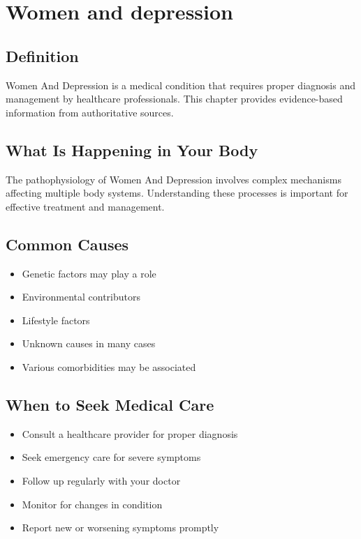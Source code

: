 
\chapter{Women and depression}

\section*{Definition}
Women And Depression is a medical condition that requires proper diagnosis and management by healthcare professionals. This chapter provides evidence-based information from authoritative sources.

\section*{What Is Happening in Your Body}
The pathophysiology of Women And Depression involves complex mechanisms affecting multiple body systems. Understanding these processes is important for effective treatment and management.

\section*{Common Causes}
\begin{itemize}
  \item Genetic factors may play a role
  \item Environmental contributors
  \item Lifestyle factors
  \item Unknown causes in many cases
  \item Various comorbidities may be associated
\end{itemize}

\section*{When to Seek Medical Care}
\begin{itemize}
  \item Consult a healthcare provider for proper diagnosis
  \item Seek emergency care for severe symptoms
  \item Follow up regularly with your doctor
  \item Monitor for changes in condition
  \item Report new or worsening symptoms promptly
\end{itemize}

